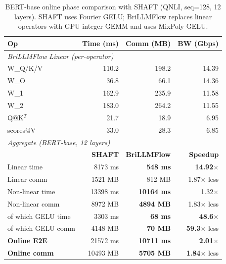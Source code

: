 \begin{table}[t]
\centering
\caption{BERT-base online phase comparison with SHAFT (QNLI, seq=128, 12 layers). SHAFT uses Fourier GELU; BriLLMFlow replaces linear operators with GPU integer GEMM and uses MixPoly GELU.}
\label{tab:bert_shaft_comparison}
\setlength{\tabcolsep}{4pt}
\footnotesize
\begin{tabular}{lrrr}
\toprule
\textbf{Op} & \textbf{Time (ms)} & \textbf{Comm (MB)} & \textbf{BW (Gbps)} \\
\midrule
\multicolumn{4}{l}{\textit{BriLLMFlow Linear (per-operator)}} \\
W\_Q/K/V    & 110.2 & 198.2 & 14.39 \\
W\_O        & 36.8 & 66.1 & 14.36 \\
W\_1        & 162.9 & 235.9 & 11.58 \\
W\_2        & 183.0 & 264.2 & 11.55 \\
Q@K$^T$     & 21.7 & 18.9 & 6.95 \\
scores@V    & 33.0 & 28.3 & 6.85 \\
\midrule
\multicolumn{4}{l}{\textit{Aggregate (BERT-base, 12 layers)}} \\
                       & \textbf{SHAFT} & \textbf{BriLLMFlow} & \textbf{Speedup} \\
Linear time            & 8173 ms & \textbf{548 ms} & \textbf{14.92}$\times$ \\
Linear comm            & 1521 MB & 812 MB & 1.87$\times$ less \\
Non-linear time        & 13398 ms & \textbf{10164 ms} & 1.32$\times$ \\
Non-linear comm        & 8972 MB & \textbf{4894 MB} & 1.83$\times$ less \\
\quad of which GELU time & 3303 ms & \textbf{68 ms} & \textbf{48.6}$\times$ \\
\quad of which GELU comm & 4148 MB & \textbf{70 MB} & \textbf{59.3}$\times$ less \\
\midrule
\textbf{Online E2E}    & 21572 ms & \textbf{10711 ms} & \textbf{2.01}$\times$ \\
\textbf{Online comm}   & 10493 MB & \textbf{5705 MB} & \textbf{1.84}$\times$ less \\
\bottomrule
\end{tabular}
\end{table}
